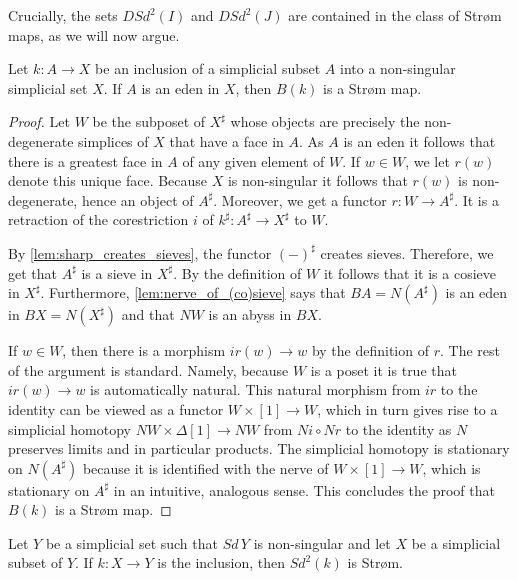 Crucially, the sets $DSd^2(I)$ and $DSd^2(J)$ are contained in the class of Str\o m maps, as we will now argue.
\begin{lemma}\label{lem:Barratt_nerve_of_inclusion_of_non-sing_is_strom}
Let $k:A\to X$ be an inclusion of a simplicial subset $A$ into a non-singular simplicial set $X$. If $A$ is an eden in $X$, then $B(k)$ is a Str\o m map.
\end{lemma}
\begin{proof}
Let $W$ be the subposet of $X^\sharp$ whose objects are precisely the non-degenerate simplices of $X$ that have a face in $A$. As $A$ is an eden it follows that there is a greatest face in $A$ of any given element of $W$. If $w\in W$, we let $r(w)$ denote this unique face. Because $X$ is non-singular it follows that $r(w)$ is non-degenerate, hence an object of $A^\sharp$. Moreover, we get a functor $r:W\to A^\sharp$. It is a retraction of the corestriction $i$ of $k^\sharp :A^\sharp \to X^\sharp$ to $W$.

By \cref{lem:sharp_creates_sieves}, the functor $(-)^\sharp$ creates sieves. Therefore, we get that $A^\sharp$ is a sieve in $X^\sharp$. By the definition of $W$ it follows that it is a cosieve in $X^\sharp$. Furthermore, \cref{lem:nerve_of_(co)sieve} says that $BA=N(A^\sharp )$ is an eden in $BX=N(X^\sharp )$ and that $NW$ is an abyss in $BX$.

If $w\in W$, then there is a morphism $ir(w)\to w$ by the definition of $r$. The rest of the argument is standard. Namely, because $W$ is a poset it is true that $ir(w)\to w$ is automatically natural. This natural morphism from $ir$ to the identity can be viewed as a functor $W\times [1]\to W$, which in turn gives rise to a simplicial homotopy $NW\times \Delta [1]\to NW$ from $Ni\circ Nr$ to the identity as $N$ preserves limits and in particular products. The simplicial homotopy is stationary on $N(A^\sharp )$ because it is identified with the nerve of $W\times [1]\to W$, which is stationary on $A^\sharp$ in an intuitive, analogous sense. This concludes the proof that $B(k)$ is a Str\o m map.
\end{proof}
\begin{corollary}\label{cor:two-fold_subdivision_strom}
Let $Y$ be a simplicial set such that $Sd\, Y$ is non-singular and let $X$ be a simplicial subset of $Y$. If $k:X\to Y$ is the inclusion, then $Sd^2(k)$ is Str\o m.
\end{corollary}
